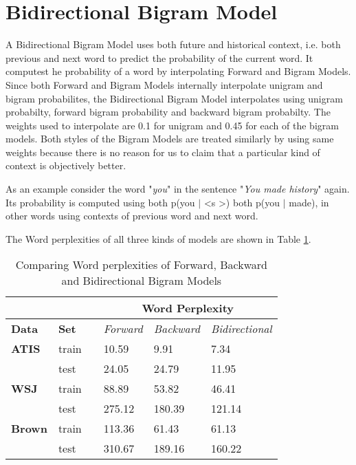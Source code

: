 \documentclass{article}
\begin{document}
\section{Bidirectional Bigram Model}
A Bidirectional Bigram Model uses both future and historical context, i.e. both previous and next word to predict the probability of the current word. It computest he probability of a word by interpolating Forward and Bigram Models. Since both Forward and Bigram Models internally interpolate unigram and bigram probabilites, the Bidirectional Bigram Model interpolates using unigram probabilty, forward bigram probability and backward bigram probabilty. The weights used to interpolate are 0.1 for unigram and 0.45 for each of the bigram models. Both styles of the Bigram Models are treated similarly by using same weights because there is no reason for us to claim that a particular kind of context is objectively better. 

As an example consider the word "\textit{you}" in the sentence "\textit{You made history}" again. Its probability is computed using both p(you $|$ \textless s \textgreater) both p(you $|$ made), in other words using contexts of previous word and next word.



The Word perplexities of all three kinds of models are shown in Table \ref{all}.
\begin{table}[h]
\centering
\begin{tabular}{@{}llllll@{}}
\toprule
\textbf{}      & \textbf{}    &  & \multicolumn{3}{c}{\textbf{Word Perplexity}}                  \\ \midrule
\textbf{Data}  & \textbf{Set} &  & \textit{Forward} & \textit{Backward} & \textit{Bidirectional} \\ \midrule
\textbf{ATIS}  & train        &  & 10.59           & 9.91             & 7.34                  \\ \midrule
               & test         &  & 24.05           & 24.79            & 11.95                 \\ \midrule
\textbf{WSJ}   & train        &  & 88.89           & 53.82            & 46.41                 \\ \midrule
               & test         &  & 275.12           & 180.39           & 121.14                \\ \midrule
\textbf{Brown} & train        &  & 113.36          & 61.43            & 61.13                  \\ \midrule
               & test         &  & 310.67          & 189.16           & 160.22               \\ \bottomrule
\end{tabular}
\caption{Comparing Word perplexities of Forward, Backward and Bidirectional Bigram Models}
\label{all}
\end{table}
\end{document}
